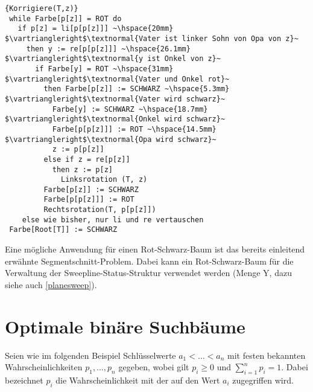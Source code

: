 \documentclass[ngerman,draft,parskip=half*,twoside]{scrreprt}
\theoremstyle{break}
\theoremstyle{nonumberbreak}
\begin{document}
\begin{Algorithmus}[H]
\begin{lstlisting}[frame=tlrb, mathescape=true, title=\textsc{Korrigiere\textnormal{(T, z)}}, gobble=1]{Korrigiere(T,z)}
 while Farbe[p[z]] = ROT do
   if p[z] = li[p[p[z]]] ~\hspace{20mm}  $\vartriangleright$\textnormal{Vater ist linker Sohn von Opa von z}~
     then y := re[p[p[z]]] ~\hspace{26.1mm} $\vartriangleright$\textnormal{y ist Onkel von z}~
       if Farbe[y] = ROT ~\hspace{31mm} $\vartriangleright$\textnormal{Vater und Onkel rot}~
         then Farbe[p[z]] := SCHWARZ ~\hspace{5.3mm} $\vartriangleright$\textnormal{Vater wird schwarz}~
           Farbe[y] := SCHWARZ ~\hspace{18.7mm} $\vartriangleright$\textnormal{Onkel wird schwarz}~
           Farbe[p[p[z]]] := ROT ~\hspace{14.5mm} $\vartriangleright$\textnormal{Opa wird schwarz}~
           z := p[p[z]]
         else if z = re[p[z]]
           then z := p[z]
             Linksrotation (T, z)
         Farbe[p[z]] := SCHWARZ
         Farbe[p[p[z]]] := ROT
         Rechtsrotation(T, p[p[z]])
    else wie bisher, nur li und re vertauschen
 Farbe[Root[T]] := SCHWARZ
\end{lstlisting}
\end{Algorithmus}

Eine mögliche Anwendung für einen Rot-Schwarz-Baum ist das bereits einleitend erwähnte Segmentschnitt-Problem. Dabei kann ein
Rot-Schwarz-Baum für die Verwaltung der Sweepline-Status-Struktur verwendet werden (Menge Y, dazu siehe auch \autoref{planesweep}).

\section{Optimale binäre Suchbäume}

Seien wie im folgenden Beispiel Schlüsselwerte $a_1<\ldots<a_n$ mit festen bekannten Wahrscheinlichkeiten $p_1,\ldots,p_n$ gegeben, wobei gilt $p_i
\geq0$ und $\sum_{i=1}^n p_i=1$. Dabei bezeichnet $p_i$ die Wahrscheinlichkeit mit der auf den Wert $a_i$ zugegriffen wird.
\end{document}
